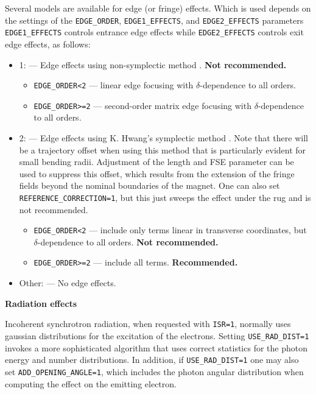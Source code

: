 Several models are available for edge (or fringe) effects. Which is used depends on the
settings of the \verb|EDGE_ORDER|, \verb|EDGE1_EFFECTS|, and \verb|EDGE2_EFFECTS| parameters
\verb|EDGE1_EFFECTS| controls entrance edge effects while \verb|EDGE2_EFFECTS| controls exit edge effects,
as follows:
\begin{itemize}
  \item 1: --- Edge effects using non-symplectic method \cite{KLBrown}. {\bf Not recommended.}
    \begin{itemize}
      \item \verb|EDGE_ORDER<2| --- linear edge focusing with $\delta$-dependence to all orders.
      \item \verb|EDGE_ORDER>=2| --- second-order matrix edge focusing with $\delta$-dependence to all orders.
    \end{itemize}              
  \item 2: --- Edge effects using K. Hwang's symplectic method \cite{KHwang}. Note that there will be a
  trajectory offset when using this method that is particularly evident for small bending radii. Adjustment of the length and FSE 
  parameter can be used to suppress this offset, which results from the extension of the fringe fields beyond the nominal
  boundaries of the magnet. One can also set \verb|REFERENCE_CORRECTION=1|, but this just sweeps the
  effect under the rug and is not recommended.
    \begin{itemize}
      \item \verb|EDGE_ORDER<2| --- include only terms linear in transverse coordinates, but $\delta$-dependence to all orders.
      {\bf Not recommended.}
      \item \verb|EDGE_ORDER>=2| --- include all terms. {\bf Recommended.}
    \end{itemize}              
  \item Other: --- No edge effects.
\end{itemize}

{\bf Radiation effects}

Incoherent synchrotron radiation, when requested with {\tt ISR=1},
normally uses gaussian distributions for the excitation of the electrons.
Setting {\tt USE\_RAD\_DIST=1} invokes a more sophisticated algorithm that
uses correct statistics for the photon energy and number distributions.
In addition, if {\tt USE\_RAD\_DIST=1} one may also set {\tt ADD\_OPENING\_ANGLE=1},
which includes the photon angular distribution when computing the effect on 
the emitting electron.  

